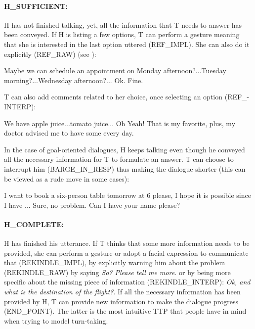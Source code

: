                    	\paragraph{H\_SUFFICIENT:} H has not finished talking, yet, all the information that T needs to answer has been conveyed. If H is listing a few options, T can perform a gesture meaning that she is interested in the last option uttered (REF\_IMPL). She can also do it explicitly (REF\_RAW) (see \cite{El-Asri2014a}):
                    
                    	\begin{dialogue}
							 Maybe we can schedule an appointment on Monday afternoon?...Tuesday morning?...Wednesday afternoon?...
							 Ok. Fine.
						\end{dialogue}
                        
                   	T can also add comments related to her choice, once selecting an option (REF\_-\\INTERP):
                    
                    	\begin{dialogue}
							 We have apple juice...tomato juice...
							 Oh Yeah! That is my favorite, plus, my doctor advised me to have some every day.
						\end{dialogue}
                    
                    In the case of goal-oriented dialogues, H keeps talking even though he conveyed all the necessary information for T to formulate an answer. T can choose to interrupt him (BARGE\_IN\_RESP) thus making the dialogue shorter (this can be viewed as a rude move in some cases):
                    
                 		\begin{dialogue}
							 I want to book a six-person table tomorrow at 6 please, I hope it is possible since I have ...
							 Sure, no problem. Can I have your name please?
						\end{dialogue}
                        
                  	\paragraph{H\_COMPLETE:} H has finished his utterance. If T thinks that some more information needs to be provided, she can perform a gesture or adopt a facial expression to communicate that (REKINDLE\_IMPL), by explicitly warning him about the problem (REKINDLE\_RAW) by saying \textit{So? Please tell me more.} or by being more specific about the missing piece of information (REKINDLE\_INTERP): \textit{Ok, and what is the destination of the flight?}. If all the necessary information has been provided by H, T can provide new information to make the dialogue progress (END\_POINT). The latter is the most intuitive TTP that people have in mind when trying to model turn-taking.
                    
